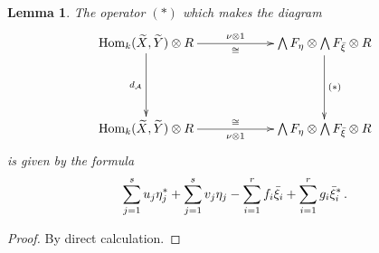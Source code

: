 \documentclass[english,letter paper,12pt,leqno]{article}
\newtheorem{lemma}[theorem]{Lemma}
\theoremstyle{example}
\numberwithin{equation}{section}
\def\AA{\mathcal{A}}
\def\Hom{\operatorname{Hom}}
\begin{document}
\begin{lemma}\label{lemma:transfer} The operator $(*)$ which makes the diagram
\[
\xymatrix@C+3pc@R+2pc{
\Hom_k( \widetilde{X}, \widetilde{Y} ) \otimes R \ar[d]_-{d_{\AA}} \ar[r]_-{\cong}^-{ \nu \otimes 1} & \bigwedge F_\eta \otimes \bigwedge F_{\Bar{\xi}} \otimes R \ar[d]^-{(*)}\\
\Hom_k( \widetilde{X}, \widetilde{Y} ) \otimes R \ar[r]^-{\cong}_-{ \nu \otimes 1 } & \bigwedge F_\eta \otimes \bigwedge F_{\Bar{\xi}} \otimes R
}
\]
is given by the formula
\[
\sum_{j=1}^s u_j \eta_j^* + \sum_{j=1}^s v_j \eta_j - \sum_{i=1}^r f_i \Bar{\xi}_i + \sum_{i=1}^r g_i \Bar{\xi}_i^*\,.
\]
\end{lemma}
\begin{proof}
By direct calculation.
\end{proof}
\end{document}
